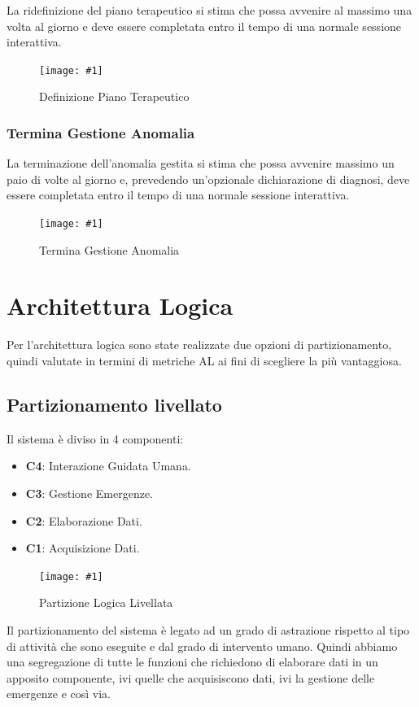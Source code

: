 \documentclass[a4paper,11pt,oneside, table]{article}
\newcommand{\putimage}[4] {
	\begin{figure}[H]
	    \centering
	    \texttt{[image: \#1]}
	    \caption{#2}\label{#3}
	\end{figure}
}
\newcommand{\bigimage}[4] {
	\begin{figure}[H]
	    \centering
	    \texttt{[image: \#1]}
	    \caption{#2}\label{#3}
	\end{figure}
}
\begin{document}
La ridefinizione del piano terapeutico si stima che possa avvenire al massimo una volta al giorno e deve essere completata entro il tempo di una normale sessione interattiva.

\putimage{images/Diagramma delle Attivita'/Definizione Piano Terapeutico.png}{Definizione Piano Terapeutico}{png:act:definizione-piano-terapeutico}{1}

\subsubsection{Termina Gestione Anomalia}

La terminazione dell'anomalia gestita si stima che possa avvenire massimo un paio di volte al giorno e, prevedendo un'opzionale dichiarazione di diagnosi, deve essere completata entro il tempo di una normale sessione interattiva.

\putimage{images/Diagramma delle Attivita'/Termina Gestione Anomalia.png}{Termina Gestione Anomalia}{png:act:termina-gestione-anomalia}{1}

\section{Architettura Logica}

Per l'architettura logica sono state realizzate due opzioni di partizionamento, quindi valutate in termini di metriche AL ai fini di scegliere la pi\`u vantaggiosa.

\subsection{Partizionamento livellato}

Il sistema \`e diviso in 4 componenti:
\begin{itemize}
  \item \textbf{C4}: Interazione Guidata Umana.
  \item \textbf{C3}: Gestione Emergenze.
  \item \textbf{C2}: Elaborazione Dati.
  \item \textbf{C1}: Acquisizione Dati.
\end{itemize}

\bigimage{images/Diagramma delle Attivita'/Partizione Logica Livellata.png}{Partizione Logica Livellata}{png:act:partizione-logica-livellata}{1}

Il partizionamento del sistema \`e legato ad un grado di astrazione rispetto al tipo di attivit\`a che sono eseguite e dal grado di intervento umano. Quindi abbiamo una segregazione di tutte le funzioni che richiedono di elaborare dati in un apposito componente, ivi quelle che acquisiscono dati, ivi la gestione delle emergenze e cos\`i via.
\end{document}
